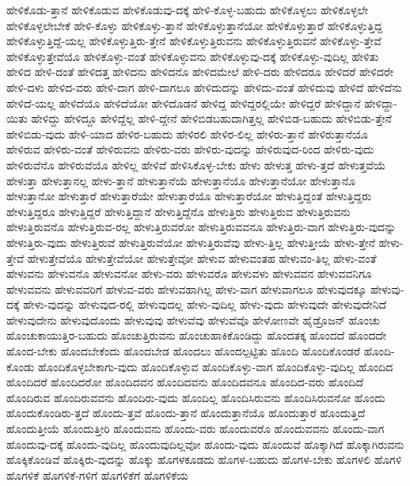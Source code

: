 {ಹೇಳಿಕೊಡು-ತ್ತಾನೆ
ಹೇಳಿಕೊಡುವ
ಹೇಳಿಕೊಡುವು-ದಕ್ಕೆ
ಹೇಳಿ-ಕೊಳ್ಳ-ಬಹುದು
ಹೇಳಿಕೊಳ್ಳಲು
ಹೇಳಿಕೊಳ್ಳಲೇ
ಹೇಳಿಕೊಳ್ಳಲೇಬೇಕೆ
ಹೇಳಿ-ಕೊಳ್ಳು
ಹೇಳಿಕೊಳ್ಳು-ತ್ತಾನೆ
ಹೇಳಿಕೊಳ್ಳುತ್ತಾನೆಯೋ
ಹೇಳಿಕೊಳ್ಳುತ್ತಾರೆ
ಹೇಳಿಕೊಳ್ಳುತ್ತಿದ್ದ
ಹೇಳಿಕೊಳ್ಳುತ್ತಿದ್ದೆ-ಯಲ್ಲ
ಹೇಳಿಕೊಳ್ಳುತ್ತಿರು-ತ್ತೇನೆ
ಹೇಳಿಕೊಳ್ಳುತ್ತಿರುವನು
ಹೇಳಿಕೊಳ್ಳುತ್ತಿರುವನೆ
ಹೇಳಿಕೊಳ್ಳು-ತ್ತೇವೆ
ಹೇಳಿಕೊಳ್ಳುತ್ತೇವೆಯೊ
ಹೇಳಿಕೊಳ್ಳು-ವಂತೆ
ಹೇಳಿಕೊಳ್ಳುವನು
ಹೇಳಿಕೊಳ್ಳುವು-ದಕ್ಕೆ
ಹೇಳಿಕೊಳ್ಳು-ವುದಿಲ್ಲ
ಹೇಳಿತು
ಹೇಳಿದ
ಹೇಳಿ-ದಂತೆ
ಹೇಳಿದತ್ತ
ಹೇಳಿದನು
ಹೇಳಿದನೊ
ಹೇಳಿದಮೇಲೆ
ಹೇಳಿ-ದರು
ಹೇಳಿದರೂ
ಹೇಳಿದರೆ
ಹೇಳಿದರೇ
ಹೇಳಿ-ದಳು
ಹೇಳಿದ-ವರು
ಹೇಳಿ-ದಾಗ
ಹೇಳಿ-ದಾಗಲೂ
ಹೇಳಿದುದನ್ನು
ಹೇಳಿದು-ವಂತೆ
ಹೇಳಿದುವು
ಹೇಳಿದೆ
ಹೇಳಿದೆನು
ಹೇಳಿದೆ-ಯಲ್ಲ
ಹೇಳಿದೆಯೊ
ಹೇಳಿದೆಯೋ
ಹೇಳಿದೊಡನೆ
ಹೇಳಿದ್ದ
ಹೇಳಿದ್ದರಲ್ಲಿಯೇ
ಹೇಳಿದ್ದರೆ
ಹೇಳಿದ್ದಾನೆ
ಹೇಳಿದ್ದಾ-ಯಿತು
ಹೇಳಿದ್ದು
ಹೇಳಿದ್ದೂ
ಹೇಳಿದ್ದೆಲ್ಲ
ಹೇಳಿ-ದ್ದೇನೆ
ಹೇಳಿಬಿಡಬಹುದಾಗಿತ್ತಲ್ಲ
ಹೇಳಿಬಿಡ-ಬಹುದು
ಹೇಳಿಬಿಡು-ತ್ತೇನೆ
ಹೇಳಿಬಿಡು-ವುದು
ಹೇಳಿ-ಯಾದ
ಹೇಳಿರ-ಬಹುದು
ಹೇಳಿರಲಿ
ಹೇಳಿರ-ಲಿಲ್ಲ
ಹೇಳಿರು-ತ್ತಾನೆ
ಹೇಳಿರುತ್ತಾನೆಯೊ
ಹೇಳಿರುವ
ಹೇಳಿರು-ವಂತೆ
ಹೇಳಿರುವನು
ಹೇಳಿರು-ವರು
ಹೇಳಿರು-ವುದನ್ನು
ಹೇಳಿರುವುದ-ರಿಂದ
ಹೇಳಿರು-ವುದು
ಹೇಳಿರುವೆನೊ
ಹೇಳಿರುವೆಯೊ
ಹೇಳಿಲ್ಲ
ಹೇಳಿವೆ
ಹೇಳಿಸಿಕೊಳ್ಳ-ಬೇಕು
ಹೇಳು
ಹೇಳುತ್ತ
ಹೇಳು-ತ್ತದೆ
ಹೇಳುತ್ತವೆಯೆ
ಹೇಳುತ್ತಾ
ಹೇಳುತ್ತಾನಲ್ಲ
ಹೇಳು-ತ್ತಾನೆ
ಹೇಳುತ್ತಾನೆಯೆ
ಹೇಳುತ್ತಾನೆಯೊ
ಹೇಳುತ್ತಾನೆಯೋ
ಹೇಳುತ್ತಾನೊ
ಹೇಳುತ್ತಾನೋ
ಹೇಳುತ್ತಾರೆ
ಹೇಳುತ್ತಾರೆಯೇ
ಹೇಳುತ್ತಾರೆಯೊ
ಹೇಳುತ್ತಾರೆಯೋ
ಹೇಳುತ್ತಿದ್ದಂತೆ
ಹೇಳುತ್ತಿದ್ದರು
ಹೇಳುತ್ತಿದ್ದರೂ
ಹೇಳುತ್ತಿದ್ದರೆ
ಹೇಳುತ್ತಿದ್ದಾನೆ
ಹೇಳುತ್ತಿದ್ದೆನೊ
ಹೇಳುತ್ತಿರು
ಹೇಳುತ್ತಿರುವ
ಹೇಳುತ್ತಿರುವನು
ಹೇಳುತ್ತಿರುವನೊ
ಹೇಳುತ್ತಿರುವ-ರಲ್ಲ
ಹೇಳುತ್ತಿರುವರೋ
ಹೇಳುತ್ತಿರುವವನೂ
ಹೇಳುತ್ತಿರು-ವಾಗ
ಹೇಳುತ್ತಿರು-ವುದನ್ನು
ಹೇಳುತ್ತಿರು-ವುದು
ಹೇಳುತ್ತಿರುವೆ
ಹೇಳುತ್ತಿರುವೆಯೋ
ಹೇಳುತ್ತಿರುವೆವು
ಹೇಳು-ತ್ತಿಲ್ಲ
ಹೇಳುತ್ತೀಯೆ
ಹೇಳು-ತ್ತೇನೆ
ಹೇಳು-ತ್ತೇವೆ
ಹೇಳುತ್ತೇವೆಯೊ
ಹೇಳುತ್ತೇವೆಯೋ
ಹೇಳುತ್ತೇವೋ
ಹೇಳುವ
ಹೇಳುವಂತಹ
ಹೇಳುವಂ-ತಿಲ್ಲ
ಹೇಳು-ವಂತೆ
ಹೇಳುವನು
ಹೇಳುವನೊ
ಹೇಳುವನೋ
ಹೇಳು-ವರು
ಹೇಳುವರೊ
ಹೇಳುವಳು
ಹೇಳುವವನ
ಹೇಳುವವನಿಗೂ
ಹೇಳುವವನು
ಹೇಳುವವರಿಗೆ
ಹೇಳುವ-ವರು
ಹೇಳುವಹಾಗಿಲ್ಲ
ಹೇಳು-ವಾಗ
ಹೇಳುವಾಗಲೂ
ಹೇಳುವುದಕ್ಕೂ
ಹೇಳುವು-ದಕ್ಕೆ
ಹೇಳು-ವುದನ್ನು
ಹೇಳುವುದ-ರಲ್ಲಿ
ಹೇಳುವುದಲ್ಲ
ಹೇಳು-ವುದಿಲ್ಲ
ಹೇಳು-ವುದು
ಹೇಳುವುದೇ
ಹೇಳುವುದೇನಿದೆ
ಹೇಳುವುದೇನು
ಹೇಳುವುದೊಂದು
ಹೇಳುವುವು
ಹೇಳುವೆವು
ಹೇಳುವೆವೊ
ಹೇಳೋಣವೇ
ಹೈಡ್ರೊಜನ್
ಹೊಂಚು
ಹೊಂಚುಕಾಯುತ್ತಿರ-ಬಹುದು
ಹೊಂಚುತ್ತಿರುವನು
ಹೊಂಚುಹಾಕಿಕೊಂಡಿದ್ದು
ಹೊಂದತಕ್ಕ
ಹೊಂದದೆ
ಹೊಂದದೇ
ಹೊಂದ-ಬೇಕು
ಹೊಂದಬೇಕೆಂದು
ಹೊಂದಬೇಡ
ಹೊಂದಲು
ಹೊಂದಲ್ಪಟ್ಟಿತು
ಹೊಂದಿ
ಹೊಂದಿಕೊಂಡರೆ
ಹೊಂದಿ-ಕೊಂಡು
ಹೊಂದಿಕೊಳ್ಳಬೇಕಾಗು-ವುದು
ಹೊಂದಿಕೊಳ್ಳುವ
ಹೊಂದಿಕೊಳ್ಳು-ವಾಗ
ಹೊಂದಿಕೊಳ್ಳು-ವುದಿಲ್ಲ
ಹೊಂದಿದ
ಹೊಂದಿದರೆ
ಹೊಂದಿದರೋ
ಹೊಂದಿದವನ
ಹೊಂದಿದವನು
ಹೊಂದಿದವನೂ
ಹೊಂದಿದ-ವರು
ಹೊಂದಿದೆ
ಹೊಂದಿರುವ
ಹೊಂದಿರುವವನು
ಹೊಂದಿರು-ವುದು
ಹೊಂದಿಲ್ಲ
ಹೊಂದಿಸಿರುವನು
ಹೊಂದಿಸಿರುವನೋ
ಹೊಂದು
ಹೊಂದುಕೊಂಡಿರು-ತ್ತದೆ
ಹೊಂದು-ತ್ತವೆ
ಹೊಂದು-ತ್ತಾನೆ
ಹೊಂದುತ್ತಾನೆಯೊ
ಹೊಂದುತ್ತಾರೆ
ಹೊಂದುತ್ತಿದೆ
ಹೊಂದುತ್ತೀಯೆ
ಹೊಂದುತ್ತೀರಿ
ಹೊಂದುವನು
ಹೊಂದು-ವರು
ಹೊಂದುವರೊ
ಹೊಂದುವವನು
ಹೊಂದು-ವಾಗ
ಹೊಂದುವು-ದಕ್ಕೆ
ಹೊಂದು-ವುದಿಲ್ಲ
ಹೊಂದುವುದಿಲ್ಲವೋ
ಹೊಂದು-ವುದು
ಹೊಂದುವೆ
ಹೊಕ್ಕಾಗಿದೆ
ಹೊಕ್ಕಾಗಿರುವನು
ಹೊಕ್ಕಿಕೊಂಡಿವೆ
ಹೊಕ್ಕಿರು-ವುದನ್ನು
ಹೊಕ್ಕು
ಹೊಗಳಕೂಡದು
ಹೊಗಳ-ಬಹುದು
ಹೊಗಳ-ಬೇಕು
ಹೊಗಳಲಿ
ಹೊಗಳಿ
ಹೊಗಳಿಕೆ
ಹೊಗಳಿಕೆ-ಗಳಿಗೆ
ಹೊಗಳಿಕೆಗೆ
ಹೊಗಳಿಕೆಯ
}
